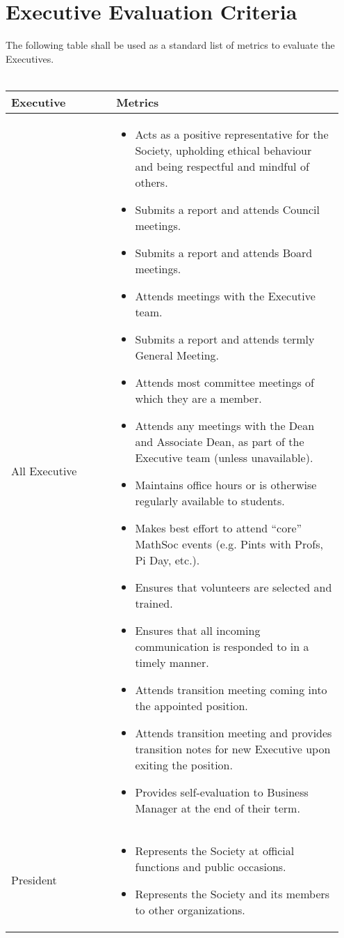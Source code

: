 \section{Executive Evaluation Criteria}

The following table shall be used as a standard list of metrics to evaluate the Executives.\\
\\
\begin{longtable}{p{0.3\linewidth} p{0.65\linewidth}}
\toprule
Executive & Metrics\\
\midrule
All Executive &
\begin{itemize}
\item Acts as a positive representative for the Society, upholding ethical behaviour and being respectful and mindful of others.
\item Submits a report and attends Council meetings.
\item Submits a report and attends Board meetings.
\item Attends meetings with the Executive team.
\item Submits a report and attends termly General Meeting.
\item Attends most committee meetings of which they are a member.
\item Attends any meetings with the Dean and Associate Dean, as part of the Executive team (unless unavailable).
\item Maintains office hours or is otherwise regularly available to students.
\item Makes best effort to attend “core” MathSoc events (e.g. Pints with Profs, Pi Day, etc.).
\item Ensures that volunteers are selected and trained.
\item Ensures that all incoming communication is responded to in a timely manner.
\item Attends transition meeting coming into the appointed position.
\item Attends transition meeting and provides transition notes for new Executive upon exiting the position.
\item Provides self-evaluation to Business Manager at the end of their term.
\end{itemize}
\\
\midrule
President &
\begin{itemize}
\item Represents the Society at official functions and public occasions.
\item Represents the Society and its members to other organizations.

\end{itemize}
\end{longtable}
